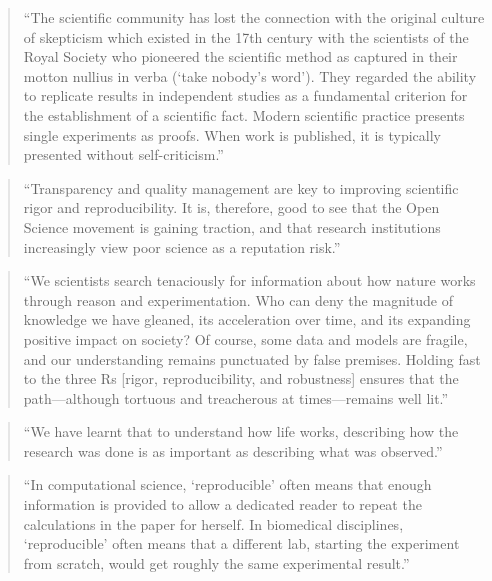 \documentclass[]{tufte-book}
\begin{document}
\begin{quote}
``The scientific community has lost the connection with the original culture of
skepticism which existed in the 17th century with the scientists of the
Royal Society who pioneered the scientific method as captured in their motton
nullius in verba (`take nobody's word'). They regarded the ability to replicate
results in independent studies as a fundamental criterion for the establishment
of a scientific fact. Modern scientific practice presents single experiments
as proofs. When work is published, it is typically presented without self-criticism.''
\citep{neff2021past}
\end{quote}

\begin{quote}
``Transparency and quality management are key to improving scientific rigor and
reproducibility. It is, therefore, good to see that the Open Science movement
is gaining traction, and that research institutions increasingly view poor
science as a reputation risk.'' \citep{neff2021past}
\end{quote}

\begin{quote}
``We scientists search tenaciously for information about how nature works through
reason and experimentation. Who can deny the magnitude of knowledge we have
gleaned, its acceleration over time, and its expanding positive impact on society?
Of course, some data and models are fragile, and our understanding remains
punctuated by false premises. Holding fast to the three Rs {[}rigor, reproducibility,
and robustness{]} ensures that the path---although tortuous and treacherous at times---remains
well lit.'' \citep{garraway2017remember}
\end{quote}

\begin{quote}
``We have learnt that to understand how life works, describing how the research was
done is as important as describing what was observed.'' \citep{lithgow2017long}
\end{quote}

\begin{quote}
``In computational science, `reproducible' often means that enough information
is provided to allow a dedicated reader to repeat the calculations in the paper for
herself. In biomedical disciplines, `reproducible' often means that a different lab,
starting the experiment from scratch, would get roughly the same experimental
result.'' \citep{stark2018before}
\end{quote}
\end{document}
